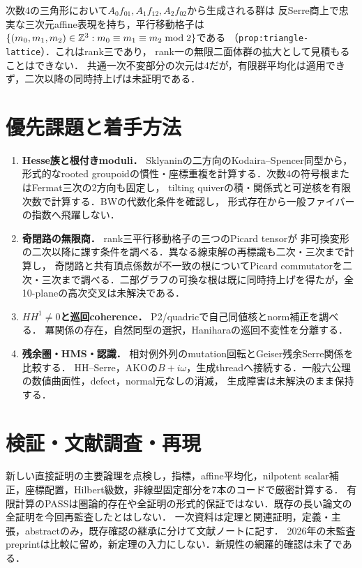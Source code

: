 \documentclass[11pt,a4paper]{ltjsarticle}
\begin{document}
次数4の三角形において$A_0f_{01},A_1f_{12},A_2f_{02}$から生成される群は
反Serre商上で忠実な三次元affine表現を持ち，平行移動格子は
$\{(m_0,m_1,m_2)\in\mathbb Z^3:m_0\equiv m_1\equiv m_2\bmod2\}$である
（\texttt{prop:triangle-lattice}）．これはrank三であり，
rank一の無限二面体群の拡大として見積もることはできない．
共通一次不変部分の次元は4だが，有限群平均化は適用できず，二次以降の同時持上げは未証明である．

\section{優先課題と着手方法}
\begin{enumerate}
\item \textbf{Hesse族と根付きmoduli．} Sklyaninの二方向のKodaira--Spencer同型から，
形式的なrooted groupoidの慣性・座標重複を計算する．次数4の符号根またはFermat三次の2方向も固定し，
tilting quiverの積・関係式と可逆核を有限次数で計算する．BWの代数化条件を確認し，
形式存在から一般ファイバーの指数へ飛躍しない．
\item \textbf{奇閉路の無限商．} rank三平行移動格子の三つのPicard tensorが
非可換変形の二次以降に課す条件を調べる．異なる線束解の再標識も二次・三次まで計算し，
奇閉路と共有頂点係数が不一致の根についてPicard commutatorを二次・三次まで調べる．二部グラフの可換な根は既に同時持上げを得たが，全10-planeの高次交叉は未解決である．
\item \textbf{$HH^1\ne0$と巡回coherence．} P2/quadricで自己同値核とnorm補正を調べる．
冪関係の存在，自然同型の選択，Haniharaの巡回不変性を分離する．
\item \textbf{残余圏・HMS・認識．} 相対例外列のmutation回転とGeiser残余Serre関係を比較する．
HH--Serre，AKOの$B+i\omega$，生成threadへ接続する．一般六公理の数値曲面性，defect，normal元なしの消滅，
生成障害は未解決のまま保持する．
\end{enumerate}

\section{検証・文献調査・再現}
新しい直接証明の主要論理を点検し，指標，affine平均化，nilpotent scalar補正，座標配置，Hilbert級数，非線型固定部分を7本のコードで厳密計算する．
有限計算のPASSは圏論的存在や全証明の形式的保証ではない．既存の長い論文の全証明を今回再監査したとはしない．
一次資料は定理と関連証明，定義・主張，abstractのみ，既存確認の継承に分けて文献ノートに記す．
2026年の未監査preprintは比較に留め，新定理の入力にしない．新規性の網羅的確認は未了である．
\end{document}
